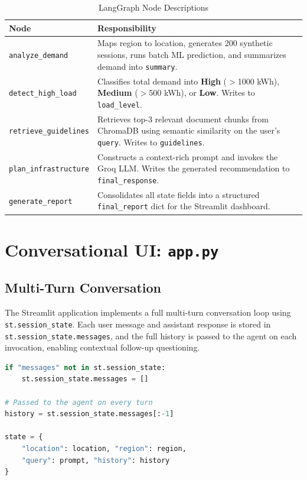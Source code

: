 \documentclass[12pt,a4paper]{article}
\newcommand{\code}[1]{\texttt{\small\color{blue!70!black}#1}}
\begin{document}
\begin{table}[H]
\centering
\caption{LangGraph Node Descriptions}
\begin{tabular}{lp{10cm}}
\toprule
\textbf{Node} & \textbf{Responsibility} \\
\midrule
\code{analyze\_demand}    & Maps region to location, generates 200 synthetic sessions, runs batch ML prediction, and summarizes demand into \code{summary}. \\[0.3cm]
\code{detect\_high\_load} & Classifies total demand into \textbf{High} ($>$1000 kWh), \textbf{Medium} ($>$500 kWh), or \textbf{Low}. Writes to \code{load\_level}. \\[0.3cm]
\code{retrieve\_guidelines} & Retrieves top-3 relevant document chunks from ChromaDB using semantic similarity on the user's \code{query}. Writes to \code{guidelines}. \\[0.3cm]
\code{plan\_infrastructure} & Constructs a context-rich prompt and invokes the Groq LLM. Writes the generated recommendation to \code{final\_response}. \\[0.3cm]
\code{generate\_report}   & Consolidates all state fields into a structured \code{final\_report} dict for the Streamlit dashboard. \\
\bottomrule
\end{tabular}
\end{table}

\newpage

\section{Conversational UI: \code{app.py}}

\subsection{Multi-Turn Conversation}

The Streamlit application implements a full multi-turn conversation loop using \code{st.session\_state}. Each user message and assistant response is stored in \code{st.session\_state.messages}, and the full history is passed to the agent on each invocation, enabling contextual follow-up questioning.

\begin{lstlisting}[style=pythonstyle, language=Python, caption={Session State Chat History}]
if "messages" not in st.session_state:
    st.session_state.messages = []

# Passed to the agent on every turn
history = st.session_state.messages[:-1]

state = {
    "location": location, "region": region,
    "query": prompt, "history": history
}
\end{lstlisting}
\end{document}
